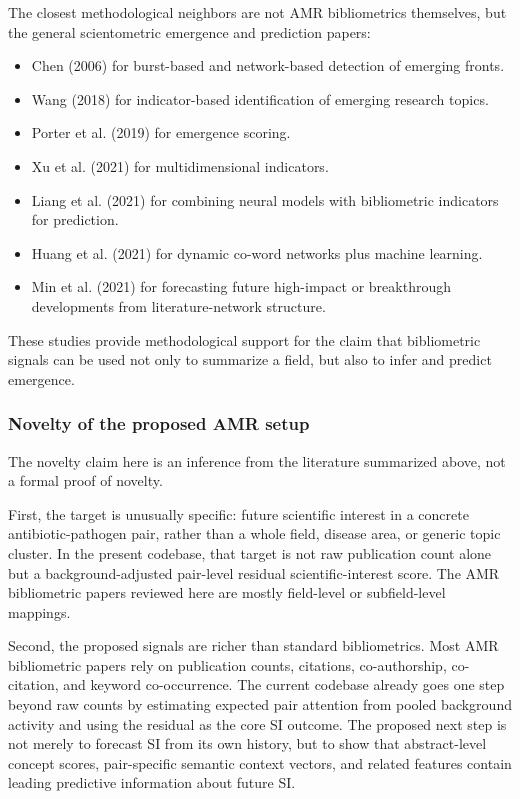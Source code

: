 \documentclass[
]{article}
\providecommand{\tightlist}{%
  \setlength{\itemsep}{0pt}\setlength{\parskip}{0pt}}
\begin{document}
The closest methodological neighbors are not AMR bibliometrics
themselves, but the general scientometric emergence and prediction
papers:

\begin{itemize}
\tightlist
\item
  Chen (2006) for burst-based and network-based detection of emerging
  fronts.
\item
  Wang (2018) for indicator-based identification of emerging research
  topics.
\item
  Porter et al. (2019) for emergence scoring.
\item
  Xu et al. (2021) for multidimensional indicators.
\item
  Liang et al. (2021) for combining neural models with bibliometric
  indicators for prediction.
\item
  Huang et al. (2021) for dynamic co-word networks plus machine
  learning.
\item
  Min et al. (2021) for forecasting future high-impact or breakthrough
  developments from literature-network structure.
\end{itemize}

These studies provide methodological support for the claim that
bibliometric signals can be used not only to summarize a field, but also
to infer and predict emergence.

\subsubsection{Novelty of the proposed AMR
setup}\label{apparent-novelty-of-the-proposed-amr-setup}

The novelty claim here is an inference from the literature summarized
above, not a formal proof of novelty.

First, the target is unusually specific: future scientific interest in a
concrete antibiotic-pathogen pair, rather than a whole field, disease
area, or generic topic cluster. In the present codebase, that target is
not raw publication count alone but a background-adjusted pair-level
residual scientific-interest score. The AMR bibliometric papers reviewed
here are mostly field-level or subfield-level mappings.

Second, the proposed signals are richer than standard bibliometrics.
Most AMR bibliometric papers rely on publication counts, citations,
co-authorship, co-citation, and keyword co-occurrence. The current
codebase already goes one step beyond raw counts by estimating expected
pair attention from pooled background activity and using the residual as
the core SI outcome. The proposed next step is not merely to forecast SI
from its own history, but to show that abstract-level concept scores,
pair-specific semantic context vectors, and related features contain
leading predictive information about future SI.
\end{document}

